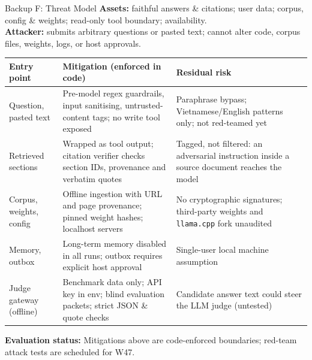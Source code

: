 \documentclass[aspectratio=1610,11pt]{beamer}
\renewcommand{\arraystretch}{1.15}
\begin{document}
\begin{frame}{Backup F: Threat Model}
  \footnotesize
  \textbf{Assets:} faithful answers \& citations; user data; corpus, config \& weights; read-only tool boundary; availability.\\
  \textbf{Attacker:} submits arbitrary questions or pasted text; cannot alter code, corpus files, weights, logs, or host approvals.\\[3pt]
  \scriptsize\renewcommand{\arraystretch}{1.08}
  \begin{tabularx}{\textwidth}{@{}>{\raggedright\arraybackslash}p{2.8cm}>{\raggedright\arraybackslash}X>{\raggedright\arraybackslash}X@{}}
    \toprule Entry point & Mitigation (enforced in code) & Residual risk\\\midrule
    Question, pasted text & Pre-model regex guardrails, input sanitising, untrusted-content tags; no write tool exposed & Paraphrase bypass; Vietnamese/English patterns only; not red-teamed yet\\
    Retrieved sections & Wrapped as tool output; citation verifier checks section IDs, provenance and verbatim quotes & Tagged, not filtered: an adversarial instruction inside a source document reaches the model\\
    Corpus, weights, config & Offline ingestion with URL and page provenance; pinned weight hashes; localhost servers & No cryptographic signatures; third-party weights and \texttt{llama.cpp} fork unaudited\\
    Memory, outbox & Long-term memory disabled in all runs; outbox requires explicit host approval & Single-user local machine assumption\\
    Judge gateway (offline) & Benchmark data only; API key in env; blind evaluation packets; strict JSON \& quote checks & Candidate answer text could steer the LLM judge (untested)\\
    \bottomrule
  \end{tabularx}
  \vspace{3pt}

  \footnotesize \textcolor{dangerred}{\textbf{Evaluation status:}} Mitigations above are code-enforced boundaries; red-team attack tests are scheduled for W47.
\end{frame}
\end{document}
